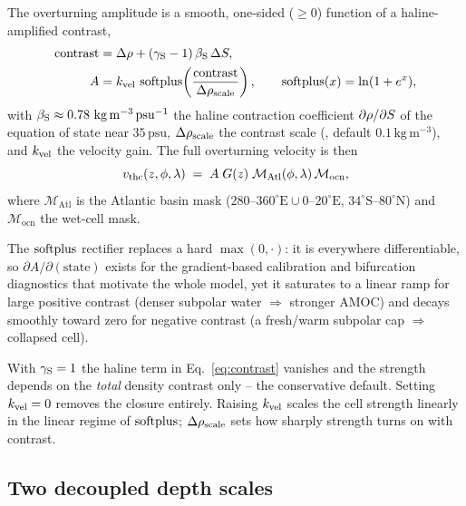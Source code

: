 The overturning amplitude is a smooth, one-sided ($\ge 0$) function of a
haline-amplified contrast,
\begin{align}
  \mathrm{contrast} &= \Delta\rho + (\gamma_{\mathrm{S}} - 1)\,\beta_{\mathrm{S}}\,\Delta S , \label{eq:contrast}\\
  A &= k_{\mathrm{vel}} \,\operatorname{softplus}\!\left(\frac{\mathrm{contrast}}{\Delta\rho_{\mathrm{scale}}}\right),
        \qquad \operatorname{softplus}(x) = \ln(1+e^{x}), \label{eq:amp}
\end{align}
with $\bS \approx 0.78\ \mathrm{kg\,m^{-3}\,psu^{-1}}$ the haline contraction
coefficient $\partial\rho/\partial S$ of the equation of state near
$35\,\mathrm{psu}$, $\Delta\rho_{\mathrm{scale}}$ the contrast scale
(, default $0.1\,\mathrm{kg\,m^{-3}}$), and $k_{\mathrm{vel}}$ the velocity
gain. The full overturning velocity is then
\begin{equation}
  v_{\mathrm{thc}}(z,\phi,\lambda) \;=\; A\;G(z)\;\mathcal{M}_{\mathrm{Atl}}(\phi,\lambda)\,\mathcal{M}_{\mathrm{ocn}},
  \label{eq:vthc}
\end{equation}
where $\mathcal{M}_{\mathrm{Atl}}$ is the Atlantic basin mask
($280$--$360^{\circ}\mathrm{E}\cup 0$--$20^{\circ}\mathrm{E}$, $34^{\circ}\mathrm{S}$--$80^{\circ}\mathrm{N}$)
and $\mathcal{M}_{\mathrm{ocn}}$ the wet-cell mask.

The $\operatorname{softplus}$ rectifier replaces a hard $\max(0,\cdot)$: it is everywhere
differentiable, so $\partial A/\partial(\text{state})$ exists for the gradient-based
calibration and bifurcation diagnostics that motivate the whole model, yet it
saturates to a linear ramp for large positive contrast (denser subpolar water
$\Rightarrow$ stronger AMOC) and decays smoothly toward zero for negative contrast
(a fresh/warm subpolar cap $\Rightarrow$ collapsed cell).

\begin{example}
With $\gamma_{\mathrm{S}}=1$ the haline term in Eq.~\eqref{eq:contrast} vanishes and the
strength depends on the \emph{total} density contrast only -- the conservative
default. Setting $k_{\mathrm{vel}}=0$ removes the closure entirely. Raising $k_{\mathrm{vel}}$ scales
the cell strength linearly in the linear regime of $\operatorname{softplus}$; $\Delta\rho_{\mathrm{scale}}$
sets how sharply strength turns on with contrast.
\end{example}

\subsection{Two decoupled depth scales}

